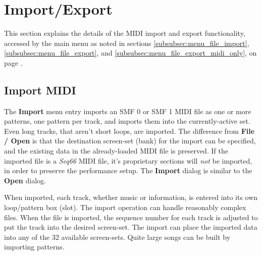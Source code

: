 %
%
%

\section{Import/Export}
\label{sec:midi_export}

   This section explains the details of the MIDI import and export
   functionality, accessed by the main menu as noted in sections
   \ref{subsubsec:menu_file_import},
   \ref{subsubsec:menu_file_export}, and
   \ref{subsubsec:menu_file_export_midi_only}, on page
   \pageref{subsubsec:menu_file_import}.

\subsection{Import MIDI}
\label{subsec:midi_export_file_import}

   The \textbf{Import} menu entry imports an SMF 0
   or SMF 1 MIDI file as one or more patterns, one pattern per track, and
   imports them into the currently-active set.
   Even long tracks, that aren't short loops, are imported.
   The difference from \textbf{File / Open} is that the destination screen-set
   (bank) for the import can be specified, and the existing data in the
   already-loaded MIDI file is preserved.
   If the imported file is a
   \textsl{Seq66} MIDI file, it's proprietary sections will
   \textsl{not} be imported, in order to preserve the performance setup.
   The \textbf{Import} dialog is similar to the \textbf{Open} dialog.

   When imported, each track, whether music or information,
   is entered into its own loop/pattern box (slot).
   The import operation can handle reasonably complex files.
   When the file is imported, the sequence number for each track is
   adjusted to put the track into the desired screen-set.
   The import can place the imported data into any of the 32 available
   screen-sets.  Quite large songs can be built by importing patterns.

